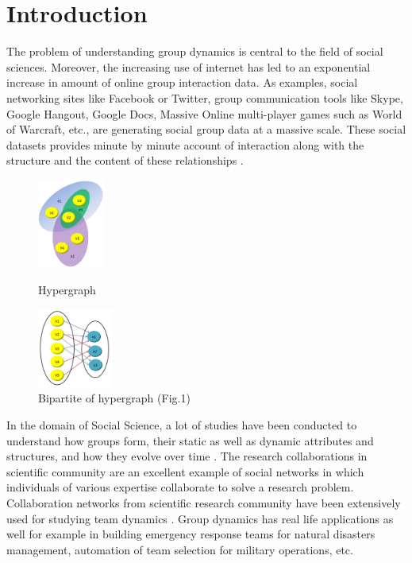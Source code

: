 \documentclass{sig-alternate}
\begin{document}


\section{Introduction}

The problem of understanding group dynamics is central to the field of social sciences. Moreover, the increasing use of internet has led to an exponential increase in amount of online group interaction data. As examples, social networking sites like Facebook or Twitter, group communication tools like Skype, Google Hangout, Google Docs, Massive Online multi-player games such as World of Warcraft, etc., are generating social group data at a massive scale. These social datasets provides minute by minute account of interaction along with the structure and the content of these relationships \cite{Vázquez28122004}. 

\begin{figure}[ht]
\begin{minipage}[b]{0.40\linewidth}
\centering
\includegraphics[width=22mm]{hypergraph.JPG}
\caption{Hypergraph}
\label{fig:figure1}
\end{minipage}
\hspace{0.5cm}
\begin{minipage}[b]{0.40\linewidth}
\centering
\includegraphics[width=25mm]{bipartite.JPG}
\caption{Bipartite of hypergraph (Fig.1)}
\label{fig:figure2}
\end{minipage}
\vspace{-1.1em}
\end{figure}

In the domain of Social Science, a lot of studies have been conducted to understand how groups form, their static as well as dynamic attributes and structures, and how they evolve over time \cite{coleman1988social}. The research collaborations in scientific community are an excellent example of social networks in which individuals of various expertise collaborate to solve a research problem. Collaboration networks from scientific research community have been extensively used for studying team dynamics \cite{katz1997research}\cite{newman2001structure}\cite{barabasi2002evolution}. Group dynamics has real life applications as well for example in building emergency response teams for natural disasters management, automation of team selection for military operations, etc. 
\end{document}
